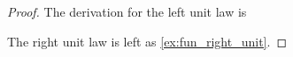\begin{proof}
The derivation for the left unit law is
\begin{prooftree}
\end{prooftree}
The right unit law is left as \cref{ex:fun_right_unit}.
\end{proof}

